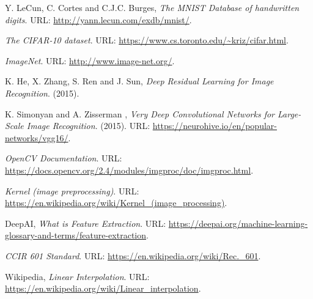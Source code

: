 

\begin{thebibliography}{3}
\frenchspacing




Y. LeCun, C. Cortes and C.J.C. Burges,
\emph{The MNIST Database of handwritten digits}.
URL: \url{http://yann.lecun.com/exdb/mnist/}.


\emph{The CIFAR-10 dataset}.
URL: \url{https://www.cs.toronto.edu/~kriz/cifar.html}.

\emph{ImageNet}.
URL: \url{http://www.image-net.org/}.


K. He, X. Zhang, S. Ren and J. Sun,
\emph{Deep Residual Learning for Image Recognition}.
(2015).


K. Simonyan and A. Zisserman
, \emph{Very Deep Convolutional Networks for Large-Scale Image Recognition}.
(2015).
URL: \url{https://neurohive.io/en/popular-networks/vgg16/}.


\emph{OpenCV Documentation}.
URL: \url{https://docs.opencv.org/2.4/modules/imgproc/doc/imgproc.html}.


\emph{Kernel (image preprocessing)}.
URL: \url{https://en.wikipedia.org/wiki/Kernel_(image_processing)}.


DeepAI,
\emph{What is Feature Extraction}.
URL: \url{https://deepai.org/machine-learning-glossary-and-terms/feature-extraction}.


\emph{CCIR 601 Standard}.
URL: \url{https://en.wikipedia.org/wiki/Rec._601}.

Wikipedia,
\emph{Linear Interpolation}.
URL: \url{https://en.wikipedia.org/wiki/Linear_interpolation}.



\end{thebibliography}
